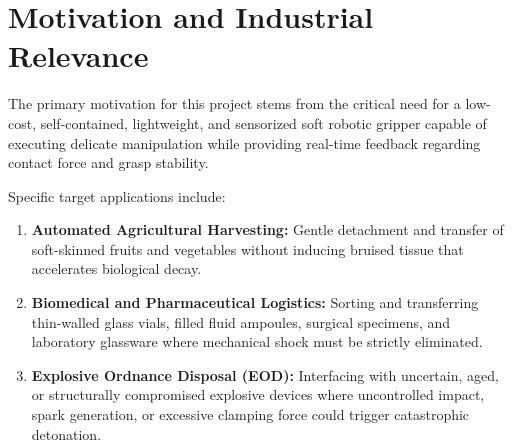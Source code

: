 \documentclass[12pt,a4paper]{report}
\begin{document}
\section{Motivation and Industrial Relevance}
The primary motivation for this project stems from the critical need for a low-cost, self-contained, lightweight, and sensorized soft robotic gripper capable of executing delicate manipulation while providing real-time feedback regarding contact force and grasp stability. 

Specific target applications include:
\begin{enumerate}
    \item \textbf{Automated Agricultural Harvesting:} Gentle detachment and transfer of soft-skinned fruits and vegetables without inducing bruised tissue that accelerates biological decay.
    \item \textbf{Biomedical and Pharmaceutical Logistics:} Sorting and transferring thin-walled glass vials, filled fluid ampoules, surgical specimens, and laboratory glassware where mechanical shock must be strictly eliminated.
    \item \textbf{Explosive Ordnance Disposal (EOD):} Interfacing with uncertain, aged, or structurally compromised explosive devices where uncontrolled impact, spark generation, or excessive clamping force could trigger catastrophic detonation.
\end{enumerate}
\end{document}

